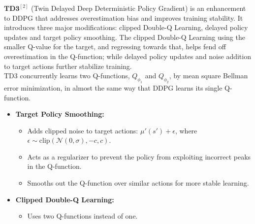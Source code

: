 \documentclass[english, a4paper,12pt]{article}
\begin{document}
\hspace*{5mm}$\textbf{TD3}^{[2]}$ (Twin Delayed Deep Deterministic Policy Gradient) is an enhancement to DDPG that addresses overestimation bias and improves training stability. It introduces three major modifications: clipped Double-Q Learning, delayed policy updates and target policy smoothing. The clipped Double-Q Learning using the smaller Q-value for the target, and regressing towards that, helps fend off overestimation in the Q-function; while delayed policy updates and noise addition to target actions further stabilize training.\\
\hspace*{5mm} TD3 concurrently learns two Q-functions, $Q_{\phi_1}$ and $Q_{\phi_2}$, by mean square Bellman error minimization, in almost the same way that DDPG learns its single Q-function. 
\begin{itemize}
    \vspace*{-2mm}
    \item \textbf{Target Policy Smoothing:} 
    \vspace*{-2mm}
    \begin{itemize}
        \item Adds clipped noise to target actions: $\mu'(s') + \epsilon$, where $\epsilon \sim \text{clip}(\mathcal{N}(0, \sigma), -c, c)$.
        \item Acts as a regularizer to prevent the policy from exploiting incorrect peaks in the Q-function.
        \item Smooths out the Q-function over similar actions for more stable learning.
    \end{itemize}
    \vspace*{-4mm}
    \item \textbf{Clipped Double-Q Learning:}
    \vspace*{-2mm}
    \begin{itemize}
        \item Uses two Q-functions instead of one.


\end{itemize}
\end{itemize}
\end{document}
